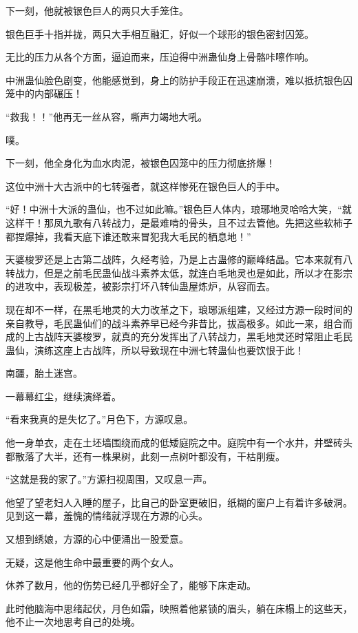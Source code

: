 \begin{this_body}
下一刻，他就被银色巨人的两只大手笼住。

银色巨手十指并拢，两只大手相互融汇，好似一个球形的银色密封囚笼。

无比的压力从各个方面，逼迫而来，压迫得中洲蛊仙身上骨骼咔嚓作响。

中洲蛊仙脸色剧变，他能感觉到，身上的防护手段正在迅速崩溃，难以抵抗银色囚笼中的内部碾压！

“救我！！”他再无一丝从容，嘶声力竭地大吼。

噗。

下一刻，他全身化为血水肉泥，被银色囚笼中的压力彻底挤爆！

这位中洲十大古派中的七转强者，就这样惨死在银色巨人的手中。

“好！中洲十大派的蛊仙，也不过如此嘛。”银色巨人体内，琅琊地灵哈哈大笑，“就这样干！那凤九歌有八转战力，是最难啃的骨头，且不过去管他。先把这些软柿子都捏爆掉，我看天底下谁还敢来冒犯我大毛民的栖息地！”

天婆梭罗还是上古第二战阵，久经考验，乃是上古蛊修的巅峰结晶。它本来就有八转战力，但是之前毛民蛊仙战斗素养太低，就连白毛地灵也是如此，所以才在影宗的进攻中，表现极差，被影宗打坏八转仙蛊屋炼炉，从容而去。

现在却不一样，在黑毛地灵的大力改革之下，琅琊派组建，又经过方源一段时间的亲自教导，毛民蛊仙们的战斗素养早已经今非昔比，拔高极多。如此一来，组合而成的上古战阵天婆梭罗，就真的充分发挥出了八转战力，黑毛地灵还时常阻止毛民蛊仙，演练这座上古战阵，所以导致现在中洲七转蛊仙也要饮恨于此！

南疆，胎土迷宫。

一幕幕红尘，继续演绎着。

“看来我真的是失忆了。”月色下，方源叹息。

他一身单衣，走在土坯墙围绕而成的低矮庭院之中。庭院中有一个水井，井壁砖头都散落了大半，还有一株果树，此刻一点树叶都没有，干枯削瘦。

“这就是我的家了。”方源扫视周围，又叹息一声。

他望了望老妇人入睡的屋子，比自己的卧室更破旧，纸糊的窗户上有着许多破洞。见到这一幕，羞愧的情绪就浮现在方源的心头。

又想到绣娘，方源的心中便涌出一股爱意。

无疑，这是他生命中最重要的两个女人。

休养了数月，他的伤势已经几乎都好全了，能够下床走动。

此时他脑海中思绪起伏，月色如霜，映照着他紧锁的眉头，躺在床榻上的这些天，他不止一次地思考自己的处境。


\end{this_body}
